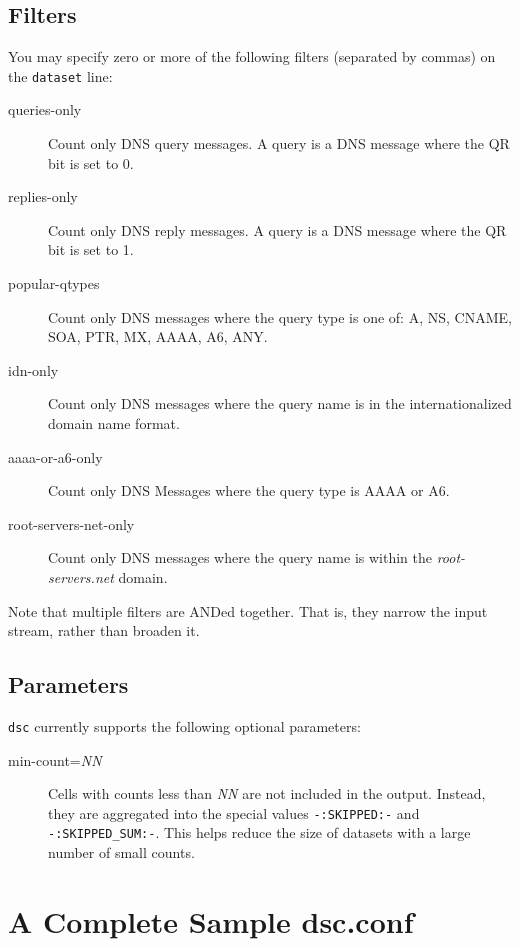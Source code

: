 \documentclass{report}
\begin{document}
\subsection{Filters}

You may specify zero or more of the following filters (separated by commas) on
the {\tt dataset\/} line:

\begin{description}
\item[queries-only]
	Count only DNS query messages.  A query is a DNS message
	where the QR bit is set to 0.
\item[replies-only]
	Count only DNS reply messages.  A query is a DNS message 
        where the QR bit is set to 1.
\item[popular-qtypes]
	Count only DNS messages where the query type is one of:
	A, NS, CNAME, SOA, PTR, MX, AAAA, A6, ANY.
\item[idn-only]
	Count only DNS messages where the query name is in the
	internationalized domain name format.
\item[aaaa-or-a6-only]
	Count only DNS Messages where the query type is AAAA or A6.
\item[root-servers-net-only]
	Count only DNS messages where the query name is within
	the {\em root-servers.net\/} domain.
\end{description}

\noindent
Note that multiple filters are ANDed together.  That is, they
narrow the input stream, rather than broaden it.

\subsection{Parameters}

\noindent
{\tt dsc\/} currently supports the following optional parameters:

\begin{description}
\item[min-count={\em NN\/}]
	Cells with counts less than {\em NN\/} are not included
	in the output.  Instead, they are aggregated into the special
	values {\tt -:SKIPPED:-\/} and {\tt -:SKIPPED\_SUM:-\/}.  This helps reduce
	the size of datasets with a large number of small counts.
\end{description}

\section{A Complete Sample dsc.conf}
\end{document}
